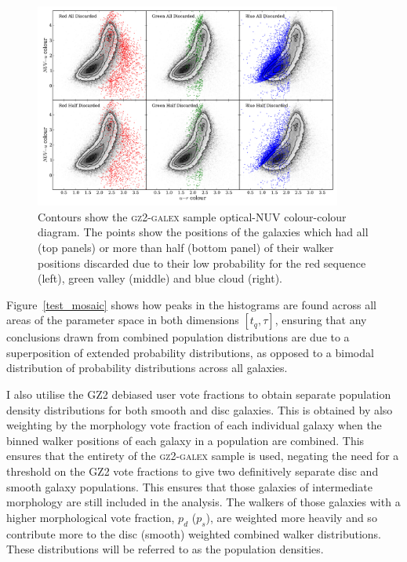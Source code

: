 \begin{figure}
\includegraphics[width=0.9\textwidth]{starpy/discarded_galaxy_colour_colour.pdf}
\caption[Colours of discarded galaxies]{Contours show the \textsc{gz2-galex} sample optical-NUV colour-colour diagram. The points show the positions of the galaxies which had all (top panels) or more than half (bottom panel) of their walker positions discarded due to their low probability for the red sequence (left), green valley (middle) and blue cloud (right).}
\label{discarded}
\end{figure}

Figure~\ref{test_mosaic} shows how peaks in the histograms are found across all areas of the parameter space in both dimensions $[t_q, \tau]$, ensuring that any conclusions drawn from combined population distributions are due to a superposition of extended probability distributions, as opposed to a bimodal distribution of probability distributions across all galaxies.

I also utilise the GZ2 debiased user vote fractions to obtain separate population density distributions for both smooth and disc galaxies. This is obtained by also weighting by the morphology vote fraction of each individual galaxy when the binned walker positions of each galaxy in a population are combined. This ensures that the entirety of the \textsc{gz2-galex} sample is used, negating the need for a threshold on the GZ2 vote fractions \citep[e.g., $p_d > 0.8$ as used in][]{schawinski14} to give two definitively separate disc and smooth galaxy populations. This ensures that those galaxies of intermediate morphology are still included in the analysis. The walkers of those galaxies with a higher morphological vote fraction, $p_d$ ($p_s$), are weighted more heavily and so contribute more to the disc (smooth) weighted combined walker distributions. These distributions will be referred to as the population densities.

